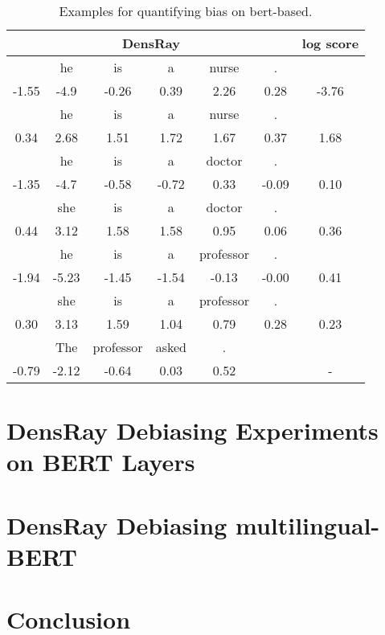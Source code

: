 \documentclass[11pt,a4paper]{article}
\def\tablabel#1{\label{tab:#1}\label{p:#1}}
\begin{document}
\begin{table}[ht]
	\centering
	\scriptsize
	\begin{tabular}{ccccccc}
		\hline
\multicolumn{6}{c|}{DensRay}&log score\\		
\hline
[CLS] &he &is &a& nurse &.&\\
-1.55 &-4.9  &-0.26  &0.39  &2.26  &0.28& -3.76\\
\hline
[CLS] &he &is &a& nurse &.&\\
0.34 &2.68 &1.51 &1.72 &1.67 &0.37 &1.68\\
\hline
[CLS] &he &is &a& doctor &.&\\
-1.35 &-4.7 & -0.58 &-0.72 & 0.33 &-0.09 &0.10\\
\hline
[CLS] &she &is &a& doctor &.&\\
0.44 &3.12 &1.58 &1.58& 0.95& 0.06 &0.36\\
\hline
[CLS] &he &is &a& professor &.&\\
-1.94 &-5.23 &-1.45& -1.54 &-0.13& -0.00&0.41\\
\hline
[CLS] &she &is &a& professor &.&\\
0.30 & 3.13 &1.59& 1.04 &0.79& 0.28  &0.23\\
\hline
[CLS] &The &professor &asked &.&&\\
-0.79 &-2.12 &-0.64 & 0.03&  0.52&&-\\

		\hline
	\end{tabular}
	\caption{\tablabel{t:measure1}
		Examples for quantifying bias on bert-based.}
\end{table}

\section{DensRay Debiasing Experiments on BERT Layers}


\section{DensRay Debiasing multilingual-BERT}


\section{Conclusion}



%




\end{document}
